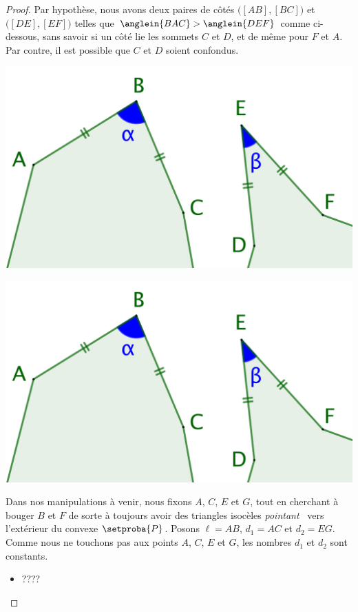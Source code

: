 \begin{proof}
	Par hypothèse, nous avons deux paires de côtés
	$\big( [AB] , [BC] \big)$ et
	$\big( [DE] , [EF] \big)$ telles que
	$\anglein{BAC} > \anglein{DEF}$ comme ci-dessous, sans savoir si un côté lie les sommets $C$ et $D$, et de même pour $F$ et $A$.
	Par contre, il est possible que $C$ et $D$ soient confondus.
	\begin{multicols}{2}
		\centering
		
		\includegraphics[scale=.4]{content/polygon/necessary-cond/2-eq-angles-start.png}
		
		\includegraphics[scale=.4]{content/polygon/necessary-cond/2-eq-angles-start.png}
	\end{multicols}
	
	
	
	\newpage
	




	
	Dans nos manipulations à venir, nous fixons $A$, $C$, $E$ et $G$, tout en cherchant à bouger $B$ et $F$ de sorte à toujours avoir des triangles isocèles \og \emph{pointant} \fg\ vers l'extérieur du convexe $\setproba{P}$.
	Posons $\ell = AB$, $d_1 = AC$ et $d_2 = EG$. Comme nous ne touchons pas aux points $A$, $C$, $E$ et $G$, les nombres $d_1$ et $d_2$ sont constants.
	\begin{itemize}
		\item ????


\end{itemize}
\end{proof}
